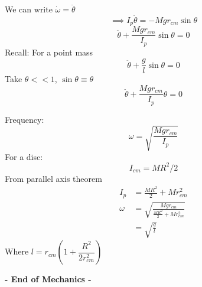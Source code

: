 \documentclass[10pt]{scrartcl}
\begin{document}
We can write $\dot{\omega} = \ddot{\theta}$
\[\implies I_p\ddot{\theta} = -Mgr_{cm}\sin\theta\]
\[\ddot{\theta} + \frac{Mgr_{cm}}{I_p}\sin\theta = 0\]
Recall: For a point mass 
\[\ddot{\theta} + \frac{g}{l}\sin\theta = 0 \]
Take $\theta << 1$, $\sin\theta \equiv \theta$
\[\ddot{\theta} + \frac{Mgr_{cm}}{I_p}\theta = 0\]

Frequency:
\[\omega = \sqrt{\frac{Mgr_{cm}}{I_p}}\]
For a disc:
\[I_{cm} = MR^2/2\]
From parallel axis theorem
\[\begin{aligned}
I_p &= \frac{MR^2}{2} + Mr^2_{cm}\\
\omega &= \sqrt{\frac{Mgr_{cm}}{\frac{MR^2}{2}+Mr^2_{cm}}}\\
&= \sqrt{\frac{g}{l}}	
\end{aligned}
\]
Where $l = r_{cm}\left(1+\dfrac{R^2}{2r_{cm}^2}\right)$~\\


  \begin{center}
  \textsf{\textbf{- End of Mechanics -}}	
  \end{center}
  
  


\end{document}
